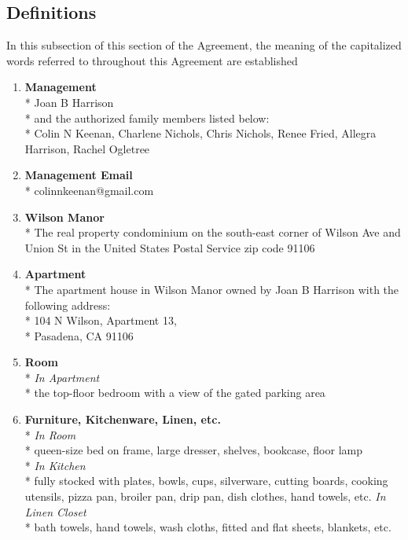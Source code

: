 \documentclass[12pt,letterpaper]{article}
\newcommand{\mom}{Joan B Harrison}
\newcommand{\management}{Management}
\newcommand{\myemail}{Management Email}
\newcommand{\condo}{Wilson Manor}
\newcommand{\apt}{Apartment}
\newcommand{\room}{Room}
\newcommand{\furniture}{Furniture, Kitchenware, Linen, etc.}
\begin{document}
\subsection{Definitions} \label{definitions}
	In this subsection of this section of the Agreement, the meaning of the capitalized words referred to throughout this Agreement are established
	\begin{multicols}{2}
		\begin{enumerate} 
			\item \textbf{\management{}}\\* \label{management}
				\noindent \mom{}\\*
				and the authorized family members listed below:\\*
				Colin N Keenan,
				Charlene Nichols,
				Chris Nichols,
				Renee Fried,
				Allegra Harrison,
				Rachel Ogletree
					
			\item \textbf{\myemail{}}\\* \label{myemail}
				colinnkeenan@gmail.com

			\item \textbf{\condo{}}\\* \label{condo}
				The real property condominium on the south-east corner of Wilson Ave and Union St in the United States Postal Service zip code 91106

			\item \textbf{\apt{}}\\* \label{apt}
				The apartment house in \condo{} owned by \mom{} with the following address:\\*
				104 N Wilson, \apt{} 13,\\* 
				Pasadena, CA  91106

			\item \textbf{\room{}}\\* \label{room}
				\textit{In \apt{}}\\*
				the top-floor bedroom with a view of the gated parking area

			\item \textbf{\furniture{}}\\* \label{furniture}
				\textit{In \room{}}\\*
				queen-size bed on frame, large dresser, shelves, bookcase, floor lamp\\*
				\textit{In Kitchen}\\*
				fully stocked with plates, bowls, cups, silverware, cutting boards, cooking utensils, pizza pan, broiler pan, drip pan, dish clothes, hand towels, etc.
				\textit{In Linen Closet}\\*
				bath towels, hand towels, wash cloths, fitted and flat sheets, blankets, etc.


\end{enumerate}
\end{multicols}
\end{document}
